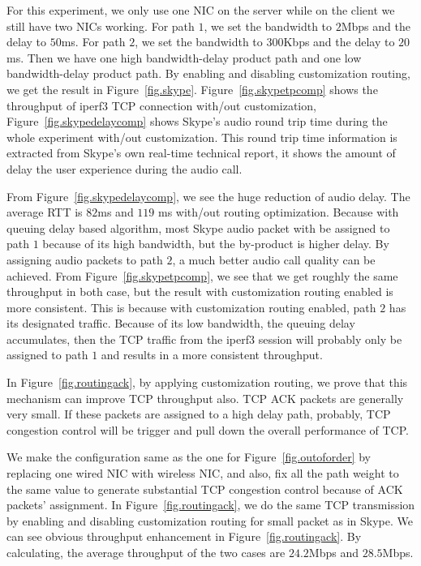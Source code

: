 For this experiment, we only use one NIC on the server while on the client we still have two NICs working. For path $1$, we set the bandwidth to $2$Mbps and the delay to $50$ms. For path $2$, we set the bandwidth to $300$Kbps and the delay to $20$ms. Then we have one high bandwidth-delay product path and one low bandwidth-delay product path. By enabling and disabling customization routing, we get the result in Figure~\ref{fig.skype}. Figure~\ref{fig.skypetpcomp} shows the throughput of iperf3 TCP connection with/out customization, Figure~\ref{fig.skypedelaycomp} shows Skype's audio round trip time during the whole experiment with/out customization. This round trip time information is extracted from Skype's own real-time technical report, it shows the amount of delay the user experience during the audio call.

From Figure~\ref{fig.skypedelaycomp}, we see the huge reduction of audio delay. The average RTT is $82$ms and $119$ ms with/out routing optimization. Because with queuing delay based algorithm, most Skype audio packet with be assigned to path $1$ because of its high bandwidth, but the by-product is higher delay. By assigning audio packets to path $2$, a much better audio call quality can be achieved. From Figure~\ref{fig.skypetpcomp}, we see that we get roughly the same throughput in both case, but the result with customization routing enabled is more consistent. This is because with customization routing enabled, path $2$ has its designated traffic. Because of its low bandwidth, the queuing delay accumulates, then the TCP traffic from the iperf3 session will probably only be assigned to path $1$ and results in a more consistent throughput.


In Figure~\ref{fig.routingack}, by applying customization routing, we prove that this mechanism can improve TCP throughput also. TCP ACK packets are generally very small. If these packets are assigned to a high delay path, probably, TCP congestion control will be trigger and pull down the overall performance of TCP.

We make the configuration same as the one for Figure~\ref{fig.outoforder} by replacing one wired NIC with wireless NIC, and also, fix all the path weight to the same value to generate substantial TCP congestion control because of ACK packets' assignment. In Figure~\ref{fig.routingack}, we do the same TCP transmission by enabling and disabling customization routing for small packet as in Skype. We can see obvious throughput enhancement in Figure~\ref{fig.routingack}. By calculating, the average throughput of the two cases are $24.2$Mbps and $28.5$Mbps.


